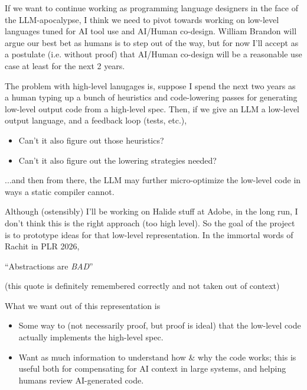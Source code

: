 
If we want to continue working as programming language designers in the face of the LLM-apocalypse, I think we need to pivot towards working on low-level languages tuned for AI tool use and AI/Human co-design.
William Brandon will argue our best bet as humans is to step out of the way, but for now I'll accept as a postulate (i.e. without proof) that AI/Human co-design will be a reasonable use case at least for the next 2 years.

The problem with high-level lanugages is, suppose I spend the next two years as a human typing up a bunch of heuristics and code-lowering passes for generating low-level output code from a high-level spec.
Then, if we give an LLM a low-level output language, and a feedback loop (tests, etc.),
\begin{itemize}
  \item Can't it also figure out those heuristics?
  \item Can't it also figure out the lowering strategies needed?
\end{itemize}
...and then from there, the LLM may further micro-optimize the low-level code in ways a static compiler cannot.

Although (ostensibly) I'll be working on Halide stuff at Adobe, in the long run, I don't think this is the right approach (too high level).
So the goal of the project is to prototype ideas for that low-level representation.
In the immortal words of Rachit in PLR 2026,

\begin{center}
  \Large
  ``Abstractions are \emph{BAD}''
\end{center}

(this quote is definitely remembered correctly and not taken out of context)

What we want out of this representation is
\begin{itemize}
  \item Some way to  (not necessarily proof, but proof is ideal) that the low-level code actually implements the high-level spec.
  \item Want as much  information to understand how \& why the code works; this is useful both for compensating for AI context in large systems, and helping humans review AI-generated code.
\end{itemize}

